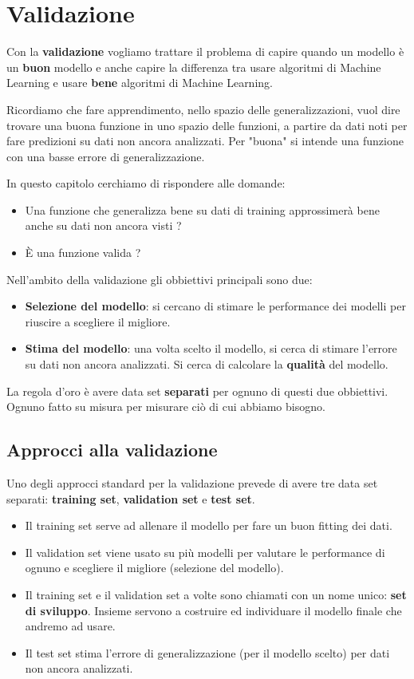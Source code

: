 \chapter{Validazione}
Con la \textbf{validazione} vogliamo trattare il problema di capire quando un modello \`e un \textbf{buon} modello e
anche capire la differenza tra usare algoritmi di Machine Learning e usare \textbf{bene} algoritmi di Machine Learning.

Ricordiamo che fare apprendimento, nello spazio delle generalizzazioni, vuol dire trovare una buona funzione in uno
spazio delle funzioni, a partire da dati noti per fare predizioni su dati non ancora analizzati. Per "buona" si intende
una funzione con una basse errore di generalizzazione.

In questo capitolo cerchiamo di rispondere alle domande:
\begin{itemize}
	\item Una funzione che generalizza bene su dati di training approssimer\`a bene anche su dati non ancora visti ?
	\item \`E una funzione valida ?
\end{itemize}

Nell'ambito della validazione gli obbiettivi principali sono due:
\begin{itemize}
	\item \textbf{Selezione del modello}: si cercano di stimare le performance dei modelli per riuscire a scegliere il
	      migliore.
	\item \textbf{Stima del modello}: una volta scelto il modello, si cerca di stimare l'errore su dati non ancora
	      analizzati. Si cerca di calcolare la \textbf{qualit\`a} del modello.
\end{itemize}
La regola d'oro \`e avere data set \textbf{separati} per ognuno di questi due obbiettivi. Ognuno fatto su misura per
misurare ci\`o di cui abbiamo bisogno.

\section{Approcci alla validazione}
Uno degli approcci standard per la validazione prevede di avere tre data set separati: \textbf{training set},
\textbf{validation set} e \textbf{test set}.
\begin{itemize}
	\item Il training set serve ad allenare il modello per fare un buon fitting dei dati.
	\item Il validation set viene usato su pi\`u modelli per valutare le performance di ognuno e scegliere il migliore
	      (selezione del modello).
	\item Il training set e il validation set a volte sono chiamati con un nome unico: \textbf{set di sviluppo}. Insieme
	      servono a costruire ed individuare il modello finale che andremo ad usare.
	\item Il test set stima l'errore di generalizzazione (per il modello scelto) per dati non ancora analizzati.
\end{itemize}

